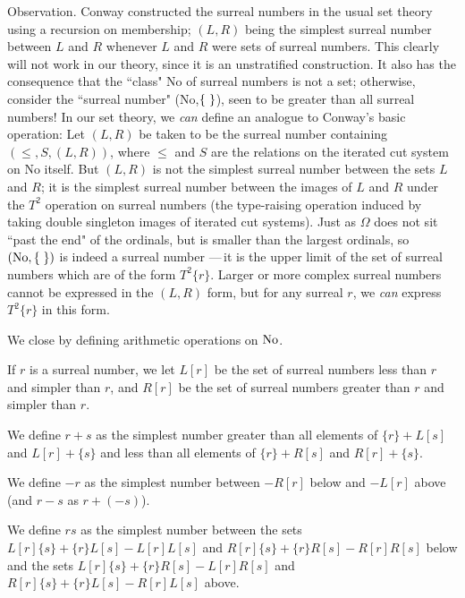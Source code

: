 \begin{ThmEtc}{Observation.}
 Conway constructed the surreal numbers in the usual set theory using a recursion on membership;
 $(L,R)$ being the simplest 
 surreal number between $L$ and $R$ whenever $L$ and $R$ were sets of surreal
 numbers.  This clearly will not work in our theory, since it is an
 unstratified construction.  It also has the consequence
 that the 
 ``class" No of surreal numbers is not a set; otherwise, consider the
 ``surreal number" (No,$\mbox{$\{\;\}$}$), seen to be greater than all surreal numbers!
 In our set theory, we {\itshape can\/} define an analogue to Conway's basic
 operation: Let $(L,R)$ be taken to be the surreal number containing
 $(\leq,S,(L,R))$, where $\leq$ and $S$ are the relations on
 the iterated cut 
 system on No itself.  But $(L,R)$ is not the simplest surreal number
 between the sets $L$ and $R$; it is the simplest surreal number between
 the images of $L$ and $R$ under the $T^2$ operation on surreal numbers (the
 type-raising operation induced by taking double
 singleton images of 
 iterated cut systems).  Just as $\Omega$ does not sit ``past the end"
 of the ordinals, but is smaller than the largest
 ordinals, so $(\mathrm{No},\mbox{$\{\;\}$})$
 is indeed a surreal number ---\,it is the upper limit of the set of
 surreal numbers which are of the form $T^2\{r\}$.  Larger
 or more complex surreal numbers cannot be expressed in the $(L,R)$ form, but
 for any surreal $r$, we {\itshape can\/} express $T^2\{r\}$ in this form.
\end{ThmEtc}

We close by defining arithmetic operations on $\mathrm{No}$.

\begin{definition}
 If $r$ is a surreal number, we let $L[r]$ be the set of
 surreal numbers less than $r$ and simpler than $r$, and $R[r]$ be the
 set of surreal numbers greater than $r$ and simpler than $r$.

 We define $r + s$ as the simplest number greater than all elements of
 $\{r\} + L[s]$ and $L[r] + \{s\}$ and less than all elements of
 $\{r\} + R[s]$ and $R[r] + \{s\}$.

 We define $-r$ as the simplest
 number between $-R[r]$ below and $-L[r]$ above (and $r-s$ as $r +
 (-s)$).

 We define $rs$ as the simplest number between the sets
 $L[r]\{s\} + \{r\}L[s] - L[r]L[s]$ and $R[r]\{s\} + \{r\}R[s] -
 R[r]R[s]$ below and the sets $L[r]\{s\} + \{r\}R[s] - L[r]R[s]$ and
 $R[r]\{s\} + \{r\}L[s] - R[r]L[s]$ above.
\end{definition}

